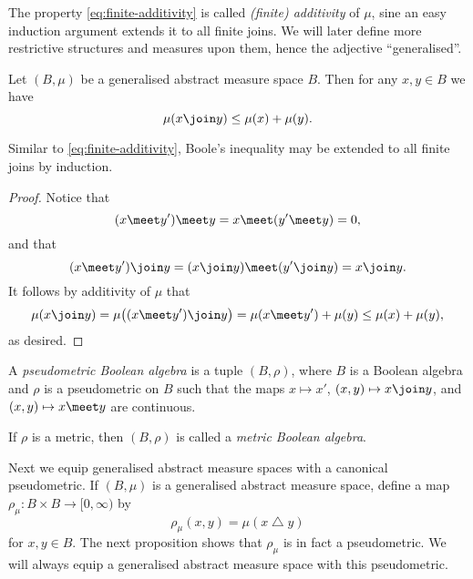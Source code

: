 \documentclass[article, a4paper, 11pt, oneside]{memoir}
\numberwithin{equation}{chapter}
\renewcommand{\symdiff}{\mathbin{\triangle}}
\begin{document}
The property \cref{eq:finite-additivity} is called \emph{(finite) additivity} of $\mu$, sine an easy induction argument extends it to all finite joins. We will later define more restrictive structures and measures upon them, hence the adjective \enquote{generalised}.

\begin{proposition}
    Let $(B,\mu)$ be a generalised abstract measure space $B$. Then for any $x,y \in B$ we have
    \begin{equation*}
        \mu(x \join y)
            \leq \mu(x) + \mu(y).
    \end{equation*}
\end{proposition}
%
Similar to \eqref{eq:finite-additivity}, Boole's inequality may be extended to all finite joins by induction.

\begin{proof}
    Notice that
    \begin{equation*}
        (x \meet y') \meet y = x \meet (y' \meet y) = 0,
    \end{equation*}
    and that
    \begin{equation*}
        (x \meet y') \join y = (x \join y) \meet (y' \join y) = x \join y.
    \end{equation*}
    It follows by additivity of $\mu$ that
    \begin{equation*}
        \mu(x \join y)
            = \mu \bigl( (x \meet y') \join y \bigr)
            = \mu(x \meet y') + \mu(y)
            \leq \mu(x) + \mu(y),
    \end{equation*}
    as desired.
\end{proof}


\begin{definition}
    A \emph{pseudometric Boolean algebra} is a tuple $(B,\rho)$, where $B$ is a Boolean algebra and $\rho$ is a pseudometric on $B$ such that the maps $x \mapsto x'$, $(x,y) \mapsto x \join y$, and $(x,y) \mapsto x \meet y$ are continuous.

    If $\rho$ is a metric, then $(B,\rho)$ is called a \emph{metric Boolean algebra}.
\end{definition}

Next we equip generalised abstract measure spaces with a canonical pseudometric. If $(B,\mu)$ is a generalised abstract measure space, define a map $\rho_\mu \colon B \times B \to [0,\infty)$ by
%
\begin{equation}
    \label{eq:Boolean-metric}
    \rho_\mu(x,y)
        = \mu(x \symdiff y)
\end{equation}
%
for $x,y \in B$. The next proposition shows that $\rho_\mu$ is in fact a pseudometric. We will always equip a generalised abstract measure space with this pseudometric.
\end{document}
